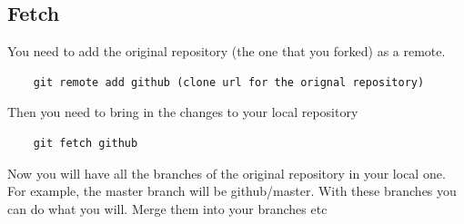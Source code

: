 \subsection{Fetch}
You need to add the original repository (the one that you forked) as a remote.
\begin{verbatim}
    git remote add github (clone url for the orignal repository)
\end{verbatim}
Then you need to bring in the changes to your local repository
\begin{verbatim}
    git fetch github
\end{verbatim}

Now you will have all the branches of the original repository in your local one. For example, the master branch will be github/master. With these branches you can do what you will. Merge them into your branches etc\\


